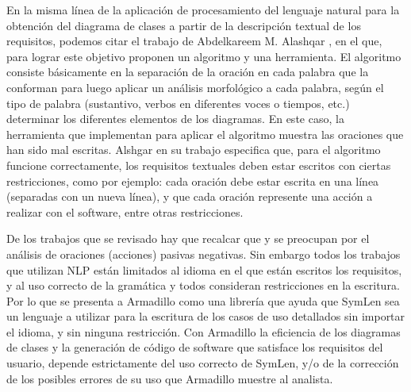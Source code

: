 En la misma línea de la aplicación de procesamiento del lenguaje natural para la obtención del diagrama de clases a partir de la descripción textual de los requisitos, podemos citar el trabajo de Abdelkareem M. Alashqar \cite{Alashqar2021}, en el que, para lograr este objetivo proponen un algoritmo y una herramienta. El algoritmo consiste básicamente en la separación de la oración en cada palabra que la conforman para luego aplicar un análisis morfológico a cada palabra, según el tipo de palabra (sustantivo, verbos en diferentes voces o tiempos, etc.) determinar los diferentes elementos de los diagramas. En este caso, la herramienta que implementan para aplicar el algoritmo muestra las oraciones que han sido mal escritas. Alshgar en su trabajo \cite{Alashqar2021} especifica que, para el algoritmo funcione correctamente, los requisitos textuales deben estar escritos con ciertas restricciones, como por ejemplo: cada oración debe estar escrita en una línea (separadas con un nueva línea), y que cada oración represente una acción a realizar con el software, entre otras restricciones. 

De los trabajos que se revisado hay que recalcar que \cite{Alashqar2021} y \cite{Shweta2020} se preocupan por el análisis de oraciones (acciones) pasivas negativas. Sin embargo todos los trabajos que utilizan NLP están limitados al idioma en el que están escritos los requisitos, y al uso correcto de la gramática y todos consideran restricciones en la escritura. Por lo que se presenta a Armadillo como una librería que ayuda que SymLen sea un lenguaje a utilizar para la escritura de los casos de uso detallados sin importar el idioma, y sin ninguna restricción. Con Armadillo la eficiencia de los diagramas de clases y la generación de código de software que satisface los requisitos del usuario, depende estrictamente del uso correcto de SymLen, y/o de la corrección de los posibles errores de su uso que Armadillo muestre al analista.



